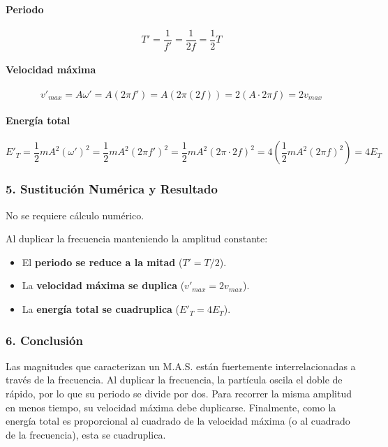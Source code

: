 \paragraph{Periodo}
$$ T' = \frac{1}{f'} = \frac{1}{2f} = \frac{1}{2} T $$
\paragraph{Velocidad máxima}
$$ v'_{max} = A \omega' = A (2\pi f') = A (2\pi (2f)) = 2 (A \cdot 2\pi f) = 2 v_{max} $$
\paragraph{Energía total}
$$ E'_T = \frac{1}{2}m A^2 (\omega')^2 = \frac{1}{2}m A^2 (2\pi f')^2 = \frac{1}{2}m A^2 (2\pi \cdot 2f)^2 = 4 \left( \frac{1}{2}m A^2 (2\pi f)^2 \right) = 4 E_T $$

\subsubsection*{5. Sustitución Numérica y Resultado}
No se requiere cálculo numérico.
\begin{cajaresultado}
Al duplicar la frecuencia manteniendo la amplitud constante:
\begin{itemize}
    \item El \textbf{periodo se reduce a la mitad} ($T' = T/2$).
    \item La \textbf{velocidad máxima se duplica} ($v'_{max} = 2v_{max}$).
    \item La \textbf{energía total se cuadruplica} ($E'_T = 4E_T$).
\end{itemize}
\end{cajaresultado}

\subsubsection*{6. Conclusión}
\begin{cajaconclusion}
Las magnitudes que caracterizan un M.A.S. están fuertemente interrelacionadas a través de la frecuencia. Al duplicar la frecuencia, la partícula oscila el doble de rápido, por lo que su periodo se divide por dos. Para recorrer la misma amplitud en menos tiempo, su velocidad máxima debe duplicarse. Finalmente, como la energía total es proporcional al cuadrado de la velocidad máxima (o al cuadrado de la frecuencia), esta se cuadruplica.
\end{cajaconclusion}

